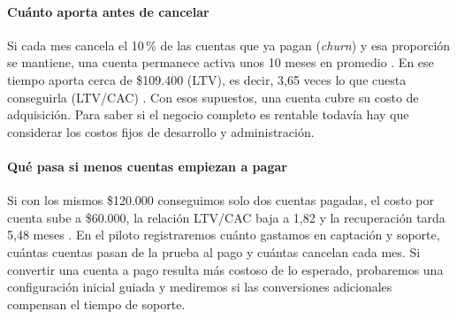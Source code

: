 \paragraph{Cuánto aporta antes de cancelar}
Si cada mes cancela el 10\,\% de las cuentas que ya pagan
(\textit{churn}) y esa proporción se mantiene, una cuenta permanece activa
unos 10 meses en promedio \hip. En ese tiempo aporta cerca de \$109.400
(LTV), es decir, 3,65 veces lo que cuesta conseguirla (LTV/CAC) \hip.
Con esos supuestos, una cuenta cubre su costo de adquisición. Para saber
si el negocio completo es rentable todavía hay que considerar los costos
fijos de desarrollo y administración.

\paragraph{Qué pasa si menos cuentas empiezan a pagar}
Si con los mismos \$120.000 conseguimos solo dos cuentas pagadas, el costo
por cuenta sube a \$60.000, la relación LTV/CAC baja a 1,82 y la recuperación
tarda 5,48 meses \hip. En el piloto registraremos cuánto gastamos en
captación y soporte, cuántas cuentas pasan de la prueba al pago y cuántas
cancelan cada mes. Si convertir una cuenta a pago resulta más costoso de
lo esperado, probaremos una configuración inicial guiada y mediremos si
las conversiones adicionales compensan el tiempo de soporte.
